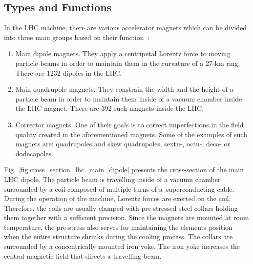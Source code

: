 
\subsection{Types and Functions}

In the LHC machine, there are various accelerator magnets which can be divided into three main groups based on their function~\cite{cern_main_webpage}: 
\begin{enumerate}
    \item Main dipole magnets. They apply a centripetal Lorentz force to moving particle beams in order to maintain them in the curvature of a 27-km ring. There are 1232 dipoles in the LHC.
    \item Main quadrupole magnets. They constrain the width and the height of a particle beam in order to maintain them inside of a vacuum chamber inside the LHC magnet. There are 392 such magnets inside the LHC.
    \item Corrector magnets. One of their goals is to correct imperfections in the field quality created in the aforementioned magnets. Some of the examples of such magnets are: quadrupoles and skew quadrupoles, sextu-, octu-, deca- or dodecapoles. 
\end{enumerate}

Fig.~\ref{fig:cross_section_lhc_main_dipole} presents the cross-section of the main LHC dipole. The particle beam is travelling inside of a vacuum chamber surrounded by a coil composed of multiple turns of a~superconducting cable. During the operation of the machine, Lorentz forces are exerted on the coil. Therefore, the coils are usually clamped with pre-stressed steel collars holding them together with a sufficient precision. Since the magnets are mounted at room temperature, the pre-stress also serves for maintaining the elements position when the entire structure shrinks during the cooling process. The collars are surrounded by a concentrically mounted iron yoke. The iron yoke increases the central magnetic field that directs a travelling beam.

